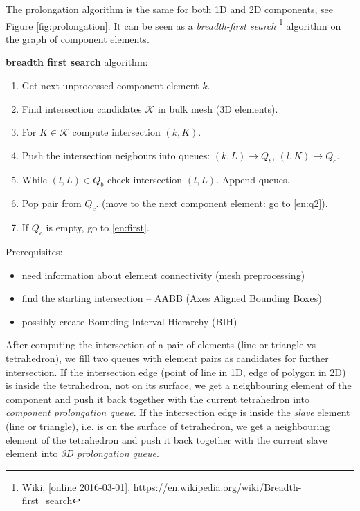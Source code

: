 \documentclass{elsarticle}
\newcommand{\fig}[1]{\hyperref[#1]{Figure \ref{#1}}}
\begin{document}
The prolongation algorithm is the same for both 1D and 2D components, see \fig{fig:prolongation}. 
It can be seen as a \emph{breadth-first search}
\footnote{Wiki, [online 2016-03-01], \url{https://en.wikipedia.org/wiki/Breadth-first_search}}
algorithm on the graph of component elements.

\textbf{breadth first search} algorithm:
  \begin{enumerate}
    \item\label{en:first} Get next unprocessed component element $k$.
    \item Find intersection candidates $\mathcal K$ in bulk mesh (3D elements).
    \item \label{en:q2}For $K\in \mathcal K$ compute intersection $(k, K)$.  
    \item Push the intersection neigbours into queues: $(k, L) \to Q_b$, $(l, K) \to Q_c$. 
    \item While $(l, L) \in Q_b$ check intersection $(l, L)$. Append queues.
    \item Pop pair from $Q_c$. (move to the next component element: go to \ref{en:q2}).
    \item If $Q_c$ is empty, go to \ref{en:first}.
  \end{enumerate}
  Prerequisites:
  \begin{itemize}
   \item need information about element connectivity (mesh preprocessing)
   \item find the starting intersection -- AABB (Axes Aligned Bounding Boxes) 
   \item possibly create Bounding Interval Hierarchy (BIH)
  \end{itemize}

After computing the intersection of a pair of elements (line or triangle vs tetrahedron), we fill
two queues with element pairs as candidates for further intersection. If the intersection edge 
(point of line in 1D, edge of polygon in 2D) is inside the tetrahedron, not on its surface, we
get a neighbouring element of the component and push it back together with the current tetrahedron into 
\emph{component prolongation queue}. If the intersection edge is inside the \emph{slave} element 
(line or triangle), i.e. is on the surface of tetrahedron, we get a neighbouring element of the tetrahedron
and push it back together with the current slave element into \emph{3D prolongation queue}.
\end{document}
